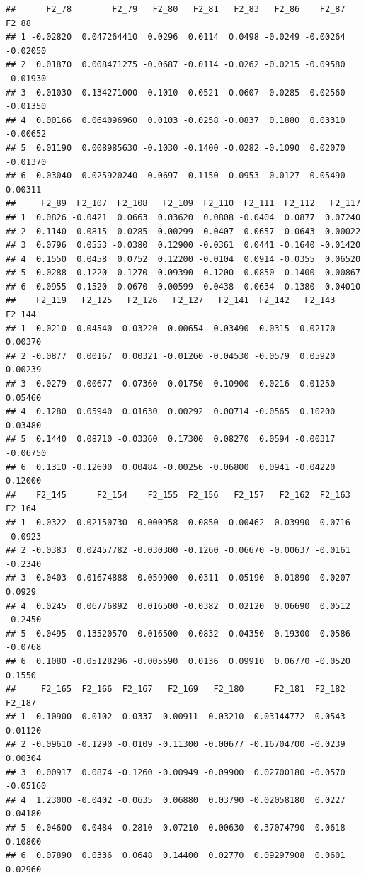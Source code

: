 \documentclass[]{article}
\begin{document}
\begin{verbatim}
##      F2_78        F2_79   F2_80   F2_81   F2_83   F2_86    F2_87    F2_88
## 1 -0.02820  0.047264410  0.0296  0.0114  0.0498 -0.0249 -0.00264 -0.02050
## 2  0.01870  0.008471275 -0.0687 -0.0114 -0.0262 -0.0215 -0.09580 -0.01930
## 3  0.01030 -0.134271000  0.1010  0.0521 -0.0607 -0.0285  0.02560 -0.01350
## 4  0.00166  0.064096960  0.0103 -0.0258 -0.0837  0.1880  0.03310 -0.00652
## 5  0.01190  0.008985630 -0.1030 -0.1400 -0.0282 -0.1090  0.02070 -0.01370
## 6 -0.03040  0.025920240  0.0697  0.1150  0.0953  0.0127  0.05490  0.00311
##     F2_89  F2_107  F2_108   F2_109  F2_110  F2_111  F2_112   F2_117
## 1  0.0826 -0.0421  0.0663  0.03620  0.0808 -0.0404  0.0877  0.07240
## 2 -0.1140  0.0815  0.0285  0.00299 -0.0407 -0.0657  0.0643 -0.00022
## 3  0.0796  0.0553 -0.0380  0.12900 -0.0361  0.0441 -0.1640 -0.01420
## 4  0.1550  0.0458  0.0752  0.12200 -0.0104  0.0914 -0.0355  0.06520
## 5 -0.0288 -0.1220  0.1270 -0.09390  0.1200 -0.0850  0.1400  0.00867
## 6  0.0955 -0.1520 -0.0670 -0.00599 -0.0438  0.0634  0.1380 -0.04010
##    F2_119   F2_125   F2_126   F2_127   F2_141  F2_142   F2_143   F2_144
## 1 -0.0210  0.04540 -0.03220 -0.00654  0.03490 -0.0315 -0.02170  0.00370
## 2 -0.0877  0.00167  0.00321 -0.01260 -0.04530 -0.0579  0.05920  0.00239
## 3 -0.0279  0.00677  0.07360  0.01750  0.10900 -0.0216 -0.01250  0.05460
## 4  0.1280  0.05940  0.01630  0.00292  0.00714 -0.0565  0.10200  0.03480
## 5  0.1440  0.08710 -0.03360  0.17300  0.08270  0.0594 -0.00317 -0.06750
## 6  0.1310 -0.12600  0.00484 -0.00256 -0.06800  0.0941 -0.04220  0.12000
##    F2_145      F2_154    F2_155  F2_156   F2_157   F2_162  F2_163  F2_164
## 1  0.0322 -0.02150730 -0.000958 -0.0850  0.00462  0.03990  0.0716 -0.0923
## 2 -0.0383  0.02457782 -0.030300 -0.1260 -0.06670 -0.00637 -0.0161 -0.2340
## 3  0.0403 -0.01674888  0.059900  0.0311 -0.05190  0.01890  0.0207  0.0929
## 4  0.0245  0.06776892  0.016500 -0.0382  0.02120  0.06690  0.0512 -0.2450
## 5  0.0495  0.13520570  0.016500  0.0832  0.04350  0.19300  0.0586 -0.0768
## 6  0.1080 -0.05128296 -0.005590  0.0136  0.09910  0.06770 -0.0520  0.1550
##     F2_165  F2_166  F2_167   F2_169   F2_180      F2_181  F2_182   F2_187
## 1  0.10900  0.0102  0.0337  0.00911  0.03210  0.03144772  0.0543  0.01120
## 2 -0.09610 -0.1290 -0.0109 -0.11300 -0.00677 -0.16704700 -0.0239  0.00304
## 3  0.00917  0.0874 -0.1260 -0.00949 -0.09900  0.02700180 -0.0570 -0.05160
## 4  1.23000 -0.0402 -0.0635  0.06880  0.03790 -0.02058180  0.0227  0.04180
## 5  0.04600  0.0484  0.2810  0.07210 -0.00630  0.37074790  0.0618  0.10800
## 6  0.07890  0.0336  0.0648  0.14400  0.02770  0.09297908  0.0601  0.02960

\end{verbatim}
\end{document}
